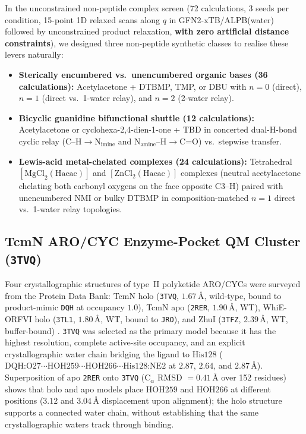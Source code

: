 \documentclass[11pt,a4paper]{article}
\begin{document}
In the unconstrained non-peptide complex screen (72 calculations, 3 seeds per condition, 15-point 1D relaxed scans along $q$ in GFN2-xTB/ALPB(water) followed by unconstrained product relaxation, \textbf{with zero artificial distance constraints}), we designed three non-peptide synthetic classes to realise these levers naturally:
\begin{itemize}
\item \textbf{Sterically encumbered vs.\ unencumbered organic bases (36 calculations):} Acetylacetone + DTBMP, TMP, or DBU with $n = 0$ (direct), $n = 1$ (direct vs.\ 1-water relay), and $n = 2$ (2-water relay).
\item \textbf{Bicyclic guanidine bifunctional shuttle (12 calculations):} Acetylacetone or cyclohexa-2,4-dien-1-one + TBD in concerted dual-H-bond cyclic relay ($\text{C--H}\to\text{N}_{\text{imine}}$ and $\text{N}_{\text{amine}}\text{--H}\to\text{C=O}$) vs.\ stepwise transfer.
\item \textbf{Lewis-acid metal-chelated complexes (24 calculations):} Tetrahedral $[\text{MgCl}_2(\text{Hacac})]$ and $[\text{ZnCl}_2(\text{Hacac})]$ complexes (neutral acetylacetone chelating both carbonyl oxygens on the face opposite $\text{C3--H}$) paired with unencumbered NMI or bulky DTBMP in composition-matched $n=1$ direct vs.\ 1-water relay topologies.
\end{itemize}

\subsection{TcmN ARO/CYC Enzyme-Pocket QM Cluster (\texttt{3TVQ})}
Four crystallographic structures of type~II polyketide ARO/CYCs were surveyed from the Protein Data Bank: TcmN holo (\texttt{3TVQ}, $1.67$\,\AA{}, wild-type, bound to product-mimic \texttt{DQH} at occupancy $1.0$), TcmN apo (\texttt{2RER}, $1.90$\,\AA{}, WT), WhiE-ORFVI holo (\texttt{3TL1}, $1.80$\,\AA{}, WT, bound to \texttt{JRO}), and ZhuI (\texttt{3TFZ}, $2.39$\,\AA{}, WT, buffer-bound) \cite{ames2008,ames2011,lee2012}. \texttt{3TVQ} was selected as the primary model because it has the highest resolution, complete active-site occupancy, and an explicit crystallographic water chain bridging the ligand to $\text{His128}$ ($\text{DQH:O27}\cdots\text{HOH259}\cdots\text{HOH266}\cdots\text{His128:NE2}$ at $2.87$, $2.64$, and $2.87$\,\AA{}). Superposition of apo \texttt{2RER} onto \texttt{3TVQ} ($\text{C}_\alpha$ RMSD $= 0.41$\,\AA{} over 152 residues) shows that holo and apo models place $\text{HOH259}$ and $\text{HOH266}$ at different positions ($3.12$ and $3.04$\,\AA{} displacement upon alignment); the holo structure supports a connected water chain, without establishing that the same crystallographic waters track through binding.
\end{document}
